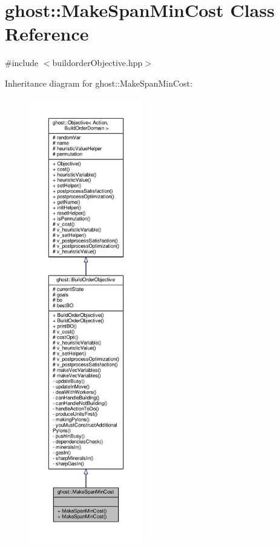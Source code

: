 \hypertarget{classghost_1_1MakeSpanMinCost}{\section{ghost\-:\-:Make\-Span\-Min\-Cost Class Reference}
\label{classghost_1_1MakeSpanMinCost}
}


{\ttfamily \#include $<$buildorder\-Objective.\-hpp$>$}



Inheritance diagram for ghost\-:\-:Make\-Span\-Min\-Cost\-:
\nopagebreak
\begin{figure}[H]
\begin{center}
\leavevmode
\includegraphics[height=550pt]{classghost_1_1MakeSpanMinCost__inherit__graph}
\end{center}
\end{figure}


